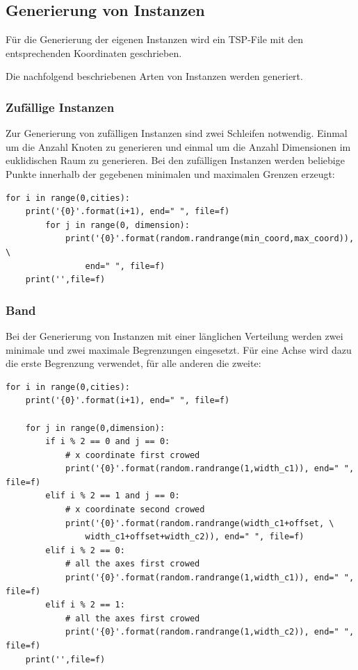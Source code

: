 \documentclass[11pt,a4paper]{article}
\begin{document}
\subsection{Generierung von Instanzen}
Für die Generierung der eigenen Instanzen wird ein TSP-File mit den entsprechenden Koordinaten geschrieben.

Die nachfolgend beschriebenen Arten von Instanzen werden generiert.

\subsubsection{Zufällige Instanzen}
Zur Generierung von zufälligen Instanzen sind zwei Schleifen notwendig. Einmal um die Anzahl Knoten zu generieren und einmal um die Anzahl Dimensionen im euklidischen Raum zu generieren. Bei den zufälligen Instanzen werden beliebige Punkte innerhalb der gegebenen minimalen und maximalen Grenzen erzeugt:

\begin{verbatim}
for i in range(0,cities):
    print('{0}'.format(i+1), end=" ", file=f)
        for j in range(0, dimension):
            print('{0}'.format(random.randrange(min_coord,max_coord)), \
                end=" ", file=f)
    print('',file=f)
\end{verbatim}

\subsubsection{Band}
Bei der Generierung von Instanzen mit einer länglichen Verteilung werden zwei minimale und zwei maximale Begrenzungen eingesetzt. Für eine Achse wird dazu die erste Begrenzung verwendet, für alle anderen die zweite:

\begin{verbatim}
for i in range(0,cities):
    print('{0}'.format(i+1), end=" ", file=f)

    for j in range(0,dimension):
        if i % 2 == 0 and j == 0:
            # x coordinate first crowed
            print('{0}'.format(random.randrange(1,width_c1)), end=" ", file=f)
        elif i % 2 == 1 and j == 0:
            # x coordinate second crowed
            print('{0}'.format(random.randrange(width_c1+offset, \
                width_c1+offset+width_c2)), end=" ", file=f) 
        elif i % 2 == 0:
            # all the axes first crowed
            print('{0}'.format(random.randrange(1,width_c1)), end=" ", file=f)
        elif i % 2 == 1:
            # all the axes first crowed
            print('{0}'.format(random.randrange(1,width_c2)), end=" ", file=f)
    print('',file=f)
\end{verbatim}
\end{document}
